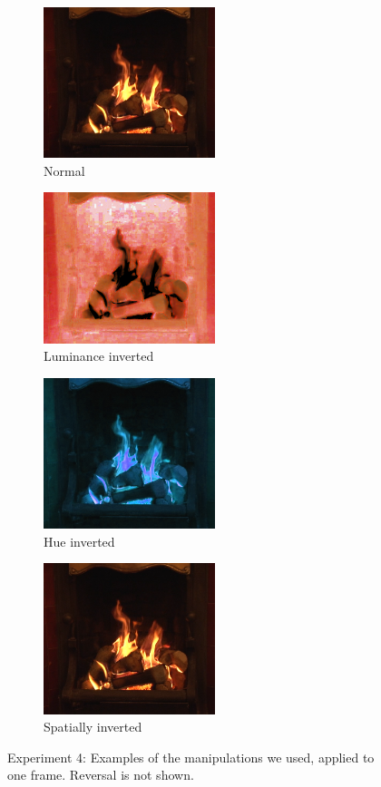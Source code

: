 \begin{figure}[htp]
\centering
\begin{subfigure}[b]{0.5\textwidth}
\centering
                \includegraphics[width=5cm]{img/frame00003.png}
                \caption{Normal}         
        \end{subfigure}\begin{subfigure}[b]{0.5\textwidth}
\centering
                \includegraphics[width=5cm]{img/frame00001.png}
                \caption{Luminance inverted}         
        \end{subfigure}

\begin{subfigure}[b]{0.5\textwidth}
\centering
                \includegraphics[width=5cm]{img/frame00002.png}
                \caption{Hue inverted}         
        \end{subfigure}\begin{subfigure}[b]{0.5\textwidth}
\centering
                \includegraphics[width=5cm,angle=180]{img/frame00003.png}
                \caption{Spatially inverted}         
        \end{subfigure}

\caption{Experiment 4: Examples of the manipulations we used, applied to one frame. Reversal is not shown.}
\end{figure}

